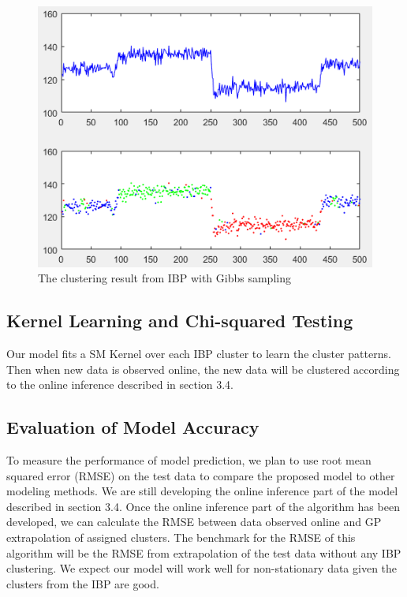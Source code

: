 \documentclass{article}
\begin{document}
\begin{figure}[ht]
\vskip 0.2in
\begin{center}
\centerline{\includegraphics[width=\columnwidth]{IBPClust}}
\caption{The clustering result from IBP with Gibbs sampling}
\label{IBPClust}
\end{center}
\vskip -0.2in
\end{figure} 


\subsection{Kernel Learning and Chi-squared Testing}

Our model fits a SM Kernel over each IBP cluster to learn the cluster patterns. Then when new data is observed online, the new data will be clustered according to the online inference described in section 3.4. 

\subsection{Evaluation of Model Accuracy}

To measure the performance of model prediction, we plan to use root mean squared error (RMSE) on the test data to compare the proposed model to other modeling methods. We are still developing the online inference part of the model described in section 3.4. Once the online inference part of the algorithm has been developed, we can calculate the RMSE between data observed online and GP extrapolation of assigned clusters. The benchmark for the RMSE of this algorithm will be the RMSE from extrapolation of the test data without any IBP clustering. We expect our model will work well for non-stationary data given the clusters from the IBP are good. 
\end{document}
